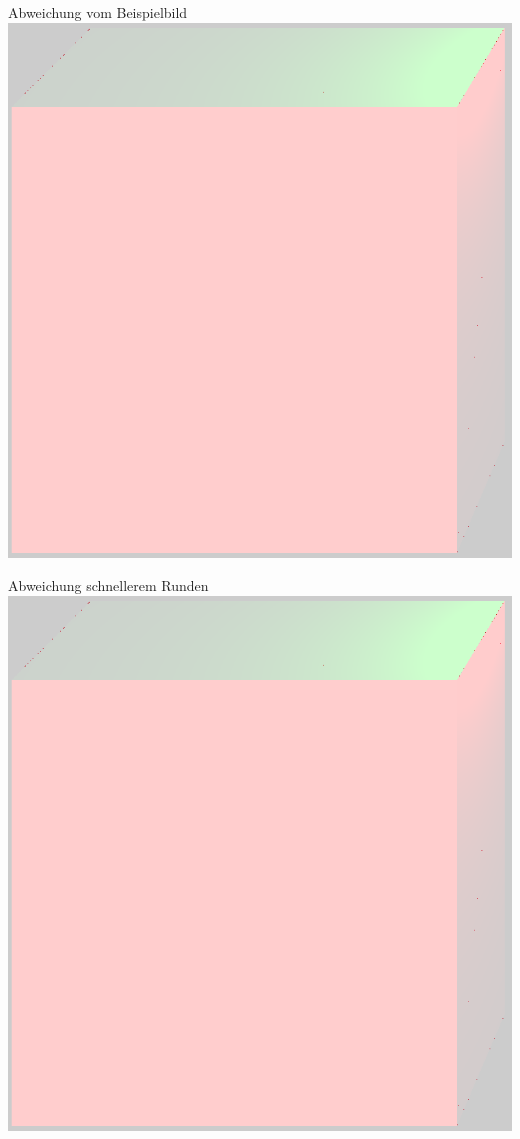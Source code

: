 	\begin{frame}{Abweichung vom Beispielbild}
		\center
		\includegraphics[height=0.8\textheight]{images/cropped_diff_ref.png}
	\end{frame}
	\begin{frame}{Abweichung schnellerem Runden}
		\center
		\includegraphics[height=0.8\textheight]{images/cropped_diff_round.png}
	\end{frame}
